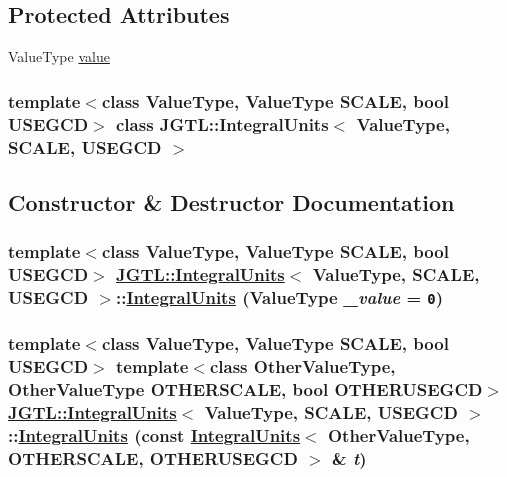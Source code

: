 \subsection*{Protected Attributes}
\begin{CompactItemize}
\item 
Value\-Type \hyperlink{class_j_g_t_l_1_1_integral_units_dd460e258138ea7485333fda3cfd8cd1}{value}
\end{CompactItemize}
\subsubsection*{template$<$class Value\-Type, Value\-Type SCALE, bool USEGCD$>$ class JGTL::Integral\-Units$<$ Value\-Type, SCALE, USEGCD $>$}



\subsection{Constructor \& Destructor Documentation}
\hypertarget{class_j_g_t_l_1_1_integral_units_7a0b8ab1d60ee081001d9f60ca277ff0}{
\subsubsection[IntegralUnits]{\setlength{\rightskip}{0pt plus 5cm}template$<$class Value\-Type, Value\-Type SCALE, bool USEGCD$>$ \hyperlink{class_j_g_t_l_1_1_integral_units}{JGTL::Integral\-Units}$<$ Value\-Type, SCALE, USEGCD $>$::\hyperlink{class_j_g_t_l_1_1_integral_units}{Integral\-Units} (Value\-Type {\em \_\-value} = {\tt 0})}}
\label{class_j_g_t_l_1_1_integral_units_7a0b8ab1d60ee081001d9f60ca277ff0}


\hypertarget{class_j_g_t_l_1_1_integral_units_281fe4bd63b000d4c79695bbf1296748}{
\subsubsection[IntegralUnits]{\setlength{\rightskip}{0pt plus 5cm}template$<$class Value\-Type, Value\-Type SCALE, bool USEGCD$>$ template$<$class Other\-Value\-Type, Other\-Value\-Type OTHERSCALE, bool OTHERUSEGCD$>$ \hyperlink{class_j_g_t_l_1_1_integral_units}{JGTL::Integral\-Units}$<$ Value\-Type, SCALE, USEGCD $>$::\hyperlink{class_j_g_t_l_1_1_integral_units}{Integral\-Units} (const \hyperlink{class_j_g_t_l_1_1_integral_units}{Integral\-Units}$<$ Other\-Value\-Type, OTHERSCALE, OTHERUSEGCD $>$ \& {\em t})}}
\label{class_j_g_t_l_1_1_integral_units_281fe4bd63b000d4c79695bbf1296748}




